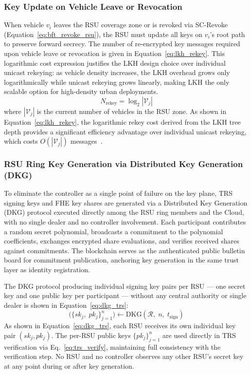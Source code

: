 \documentclass[12pt, a4paper]{report}
\begin{document}
\subsubsection{Key Update on Vehicle Leave or Revocation}

When vehicle $v_i$ leaves the RSU coverage zone or is revoked via
SC-Revoke (Equation~\ref{eq:bft_revoke_rsu}), the RSU must update all
keys on $v_i$'s root path to preserve forward secrecy. The number
of re-encrypted key messages required upon vehicle leave or revocation
is given in Equation~\ref{eq:lkh_rekey}.
\newline
\newline
This logarithmic cost expression justifies the LKH design choice
over individual unicast rekeying: as vehicle density increases,
the LKH overhead grows only logarithmically while unicast rekeying
grows linearly, making LKH the only scalable option for high-density
urban deployments.
\begin{equation}
  N_{\mathrm{rekey}} = \log_2 |\mathcal{V}_j|
  \label{eq:lkh_rekey}
\end{equation}
where $|\mathcal{V}_j|$ is the current number of vehicles in the RSU
zone. As shown in Equation~\ref{eq:lkh_rekey}, the logarithmic rekey
cost derived from the LKH tree depth provides a significant efficiency
advantage over individual unicast rekeying, which costs
$O(|\mathcal{V}_j|)$ messages~\cite{zhong2022broadcast}.

\subsubsection{RSU Ring Key Generation via Distributed Key Generation (DKG)}

To eliminate the controller as a single point of failure on the
key plane, TRS signing keys and FHE key shares are generated via
a Distributed Key Generation (DKG) protocol executed directly
among the RSU ring members and the Cloud, with no single dealer
and no controller involvement. Each participant contributes a
random secret polynomial, broadcasts a commitment to the
polynomial coefficients, exchanges encrypted share evaluations,
and verifies received shares against commitments. The blockchain
serves as the authenticated public bulletin board for commitment
publication, anchoring key generation in the same trust layer as
identity registration.

The DKG protocol producing individual signing key pairs per RSU
--- one secret key and one public key per participant --- without
any central authority or single dealer is shown in
Equation~\ref{eq:dkg_trs}:
\begin{equation}
  \bigl(\{sk_j,\; pk_j\}_{j=1}^{n}\bigr)
  \leftarrow \mathrm{DKG}(\mathcal{R},\; n,\; t_{\mathrm{sign}})
  \label{eq:dkg_trs}
\end{equation}
As shown in Equation~\ref{eq:dkg_trs}, each RSU receives its own
individual key pair $(sk_j, pk_j)$. The per-RSU public keys
$\{pk_j\}_{j=1}^{n}$ are used directly in TRS verification via
Eq.~\eqref{eq:trs_verify}, maintaining full consistency with the
verification step. No RSU and no controller observes any other
RSU's secret key at any point during or after key generation.
\end{document}
